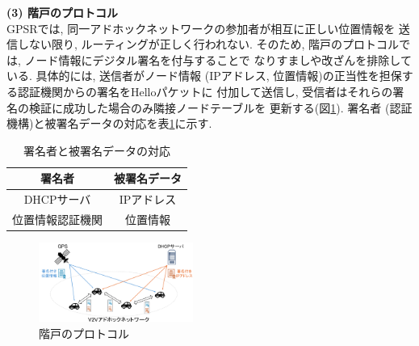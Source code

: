 \documentclass[a4j,9pt,twocolumn]{jsarticle}
\begin{document}
\newpage
\noindent\textbf{(3) 階戸のプロトコル}\\
\indent GPSRでは, 同一アドホックネットワークの参加者が相互に正しい位置情報を
送信しない限り, ルーティングが正しく行われない. そのため, 
階戸のプロトコル\cite{shinato}では, ノード情報にデジタル署名を付与することで
なりすましや改ざんを排除している. 具体的には, 送信者がノード情報 
(IPアドレス, 位置情報)の正当性を担保する認証機関からの署名をHelloパケットに
付加して送信し, 受信者はそれらの署名の検証に成功した場合のみ隣接ノードテーブルを
更新する(図\ref{fig:introduce}). 
署名者 (認証機構)と被署名データの対応を表\ref{tab:sign}に示す. 
\vspace{-3mm}
\begin{table}[h]
    \centering
    \caption{署名者と被署名データの対応\cite{shinato}}
    \label{tab:sign}
    \begin{tabular}{cc} \hline
        署名者 & 被署名データ \\ \hline \hline
        DHCPサーバ & IPアドレス \\
        位置情報認証機関 & 位置情報 \\ \hline
    \end{tabular}
\end{table}
\vspace{-5mm} %
\begin{figure}[h]
    \centering
    \includegraphics[width=0.45\textwidth]{figures/introduce.png}
    \caption{階戸のプロトコル\cite{shinato}}
    \label{fig:introduce}
\end{figure}
\vspace{-5mm}
\end{document}
